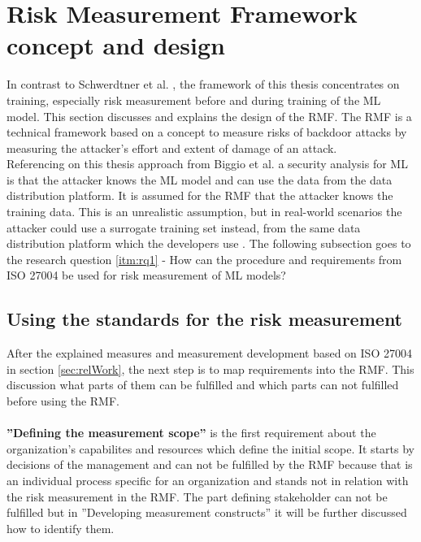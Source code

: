 
\section{Risk Measurement Framework concept and design}
\label{sec:conFrame}

In contrast to Schwerdtner et al. \cite{DBLP:journals/corr/abs-2011-04328}, the framework of this thesis concentrates on training, especially risk measurement before and during training of the ML model. This section discusses and explains the design of the RMF. The RMF is a technical framework based on a concept to measure risks of backdoor attacks \cite{DBLP:conf/eusipco/ArshadAQLY21} by measuring the attacker's effort and extent of damage of an attack. \\ Referencing on this thesis approach from Biggio et al. \cite{DBLP:conf/icml/BiggioNL12} a security analysis for ML is that the attacker knows the ML model and can use the data from the data distribution platform. It is assumed for the RMF that the attacker knows the training data. This is an unrealistic assumption, but in real-world scenarios the attacker could use a surrogate training set instead, from the same data distribution platform which the developers use \cite{DBLP:journals/ml/BarrenoNJT10}. The following subsection goes to the research question \ref{itm:rq1} - How can the procedure and requirements from ISO 27004 be used for risk measurement of ML models?

\subsection{Using the standards for the risk measurement}
\label{sec:standard}

After the explained measures and measurement development based on ISO 27004 in section \ref{sec:relWork}, the next step is to map requirements into the RMF. This discussion what parts of them can be fulfilled and which parts can not fulfilled before using the RMF. \\ \\

\textbf{''Defining the measurement scope''} is the first requirement about the organization's capabilites and resources which define the initial scope. It starts by decisions of the management and can not be fulfilled by the RMF because that is an individual process specific for an organization and stands not in relation with the risk measurement in the RMF. The part defining stakeholder can not be fulfilled but in ''Developing measurement constructs'' it will be further discussed how to identify them.  \\ \\

